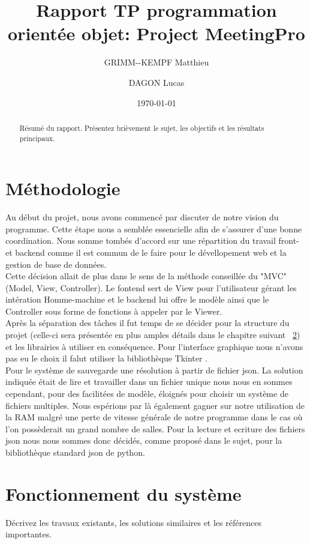 \documentclass[a4paper,12pt]{article}
\title{Rapport TP programmation orientée objet: Project MeetingPro}
\author{
  GRIMM-{}-KEMPF Matthieu\\
  \and
  DAGON Lucas
}
\date{\today}
\begin{document}
\maketitle

\begin{abstract}
Résumé du rapport. Présentez brièvement le sujet, les objectifs et les résultats principaux.
\end{abstract}

\tableofcontents
\newpage

\section{Méthodologie}
Au début du projet, nous avons commencé par discuter de notre vision du programme. Cette étape nous a semblée essencielle afin de s'assurer d'une bonne coordination. Nous somme tombés d'accord sur une répartition du travail front- et backend comme il est commun de le faire pour le dévellopement web et la gestion de base de données.\\
Cette décision allait de plus dans le sens de la méthode conseillée du "MVC" (Model, View, Controller). Le fontend sert de View pour l'utilisateur gérant les intération Homme-machine et le backend lui offre le modèle ainsi que le Controller sous forme de fonctions à appeler par le Viewer.\\

Après la séparation des tâches il fut temps de se décider pour la structure du projet (celle-ci sera présentée en plus amples détails dans le chapitre suivant ~\ref{fonction_sys}) et les librairies à utiliser en conséquence. Pour l'interface graphique nous n'avons pas eu le choix il falut utiliser la bibliothèque Tkinter \cite{python_tk}.\\
Pour le système de sauvegarde une résolution à partir de fichier json. La solution indiquée était de lire et travailler dans un fichier unique nous nous en sommes cependant, pour des facilitées de modèle, éloignés pour choisir un système de fichiers multiples. Nous espérions par là également gagner sur notre utilisation de la RAM malgré une perte de vitesse générale de notre programme dans le cas où l'on possèderait un grand nombre de salles.
Pour la lecture et ecriture des fichiers json nous nous sommes donc décidés, comme proposé dans le sujet, pour la bibliothèque standard json \cite{python_json} de python.

\section{Fonctionnement du système} \label{fonction_sys}
Décrivez les travaux existants, les solutions similaires et les références importantes.
\end{document}
